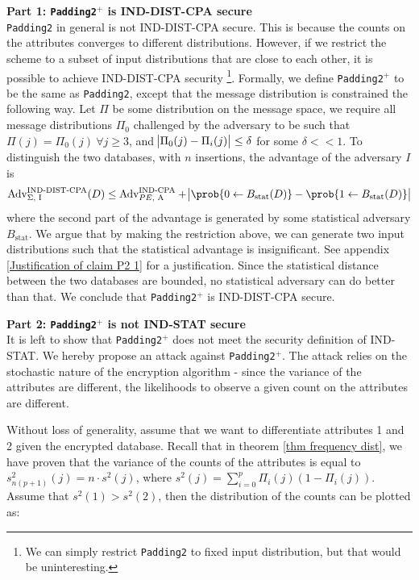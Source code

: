 \textbf{Part 1: \texttt{Padding2}$^{+}$ is IND-DIST-CPA secure} \\
\texttt{Padding2} in general is not IND-DIST-CPA secure. This is because the counts on the attributes converges to different distributions. However, if we restrict the scheme to a subset of input distributions that are close to each other, it is possible to achieve IND-DIST-CPA security \footnote{We can simply restrict \texttt{Padding2} to fixed input distribution, but that would be uninteresting.}. Formally, we define \texttt{Padding2$^+$} to be the same as \texttt{Padding2}, except that the message distribution is constrained the following way. Let $\Pi$ be some distribution on the message space, we require all message distributions $\Pi_0$ challenged by the adversary to be such that $\Pi(j) = \Pi_0(j) \ \forall j \geq 3$, and $\abs{\Pi_0(j) - \Pi_i(j)} \leq \delta$ for some $\delta << 1$. To distinguish the two databases, with $n$ insertions, the advantage of the adversary $I$ is
\begin{equation}
	\text{Adv}_{\text{$\Sigma$, I}}^{\text{IND-DIST-CPA}}(D) \leq \text{Adv}_{\text{$PE$, A}}^{\text{IND-CPA}} + \abs{\prob{0 \leftarrow B_{\text{stat}}(D)} - \prob{1 \leftarrow B_{\text{stat}}(D)}}
\end{equation}
where the second part of the advantage is generated by some statistical adversary $B_\text{stat}$. We argue that by making the restriction above, we can generate two input distributions such that the statistical advantage is insignificant. See appendix \ref{Justification of claim P2 1} for a justification. Since the statistical distance between the two databases are bounded, no statistical adversary can do better than that. We conclude that \texttt{Padding2$^+$} is IND-DIST-CPA secure.


\textbf{Part 2: \texttt{Padding2}$^{+}$ is not IND-STAT secure} \\
It is left to show that \texttt{Padding2}$^{+}$ does not meet the security definition of IND-STAT. We hereby propose an attack against \texttt{Padding2}$^{+}$. The attack relies on the stochastic nature of the encryption algorithm - since the variance of the attributes are different, the likelihoods to observe a given count on the attributes are different.

Without loss of generality, assume that we want to differentiate attributes 1 and 2 given the encrypted database. Recall that in theorem \ref{thm frequency dist}, we have proven that the variance of the counts of the attributes is equal to $s_{n(p+1)}^2(j) = n \cdot s^2(j)$, where $s^2(j) = \sum_{i= 0}^{p} \Pi_i(j) (1 - \Pi_i(j))$. Assume that $s^2(1) > s^2(2)$, then the distribution of the counts can be plotted as:

